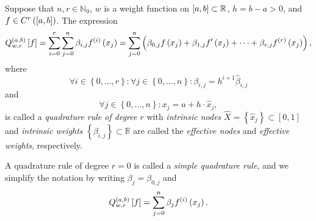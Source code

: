 \begin{frame}
    \begin{definition}
        Suppose that $n,r\in\mathbb{N}_{0}$,
        $w$ is a weight function on
        \begin{math}
            \left[a,b\right]\subset
            \mathbb{R}
        \end{math},
        $h=b-a>0$, and
        \begin{math}
            f\in
            C^{r}\left(
            \left[a,b\right]
            \right)
        \end{math}.
        The expression
        \begin{equation*}
            Q^{\left(a,b\right)}_{w,r}
            \left[f\right]=
            \sum_{i=0}^{r}
            \sum_{j=0}^{n}
            \beta_{i,j}
            f^{\left(i\right)}
            \left(x_{j}\right)=
            \sum_{j=0}^{n}
            \left(
            \beta_{0,j}
            f\left(x_{j}\right)+
            \beta_{1,j}
            f^{\prime}
            \left(x_{j}\right)+
            \cdots+
            \beta_{r,j}
            f^{\left(r\right)}
            \left(x_{j}\right)
            \right),
        \end{equation*}
        where
        \begin{equation*}
            \forall i\in
            \left\{0,\dotsc,r\right\}:
            \forall j\in
            \left\{0,\dotsc,n\right\}:
            \beta_{i,j}=
            h^{i+1}
            \widehat{\beta}_{i,j}
        \end{equation*}
        and
        \begin{equation*}
            \forall j\in
            \left\{0,\dotsc,n\right\}:
            x_{j}=
            a+
            h\cdot
            \widehat{x}_{j},
        \end{equation*}
        is called a \emph{quadrature rule of degree $r$} with
        \emph{intrinsic nodes}
        \begin{math}
            \widehat{X}=
            \left\{
            \widehat{x}_{j}
            \right\}\subset
            \left[0,1\right]
        \end{math}
        and \emph{intrinsic weights}
        \begin{math}
            \left\{
            \beta_{i,j}
            \right\}
            \subset
            \mathbb{R}
        \end{math}
        are called the \emph{effective nodes} and
        \emph{effective weights}, respectively.
    \end{definition}
    A quadrature rule of degree $r=0$ is called a
    \emph{simple quadrature rule}, and we simplify the notation
    by writing $\beta_{j}=\beta_{0,j}$ and
    \begin{equation*}
        Q^{\left(a,b\right)}_{w,r}
        \left[f\right]=
        \sum_{j=0}^{n}
        \beta_{j}
        f^{\left(i\right)}
        \left(x_{j}\right).
    \end{equation*}
\end{frame}


